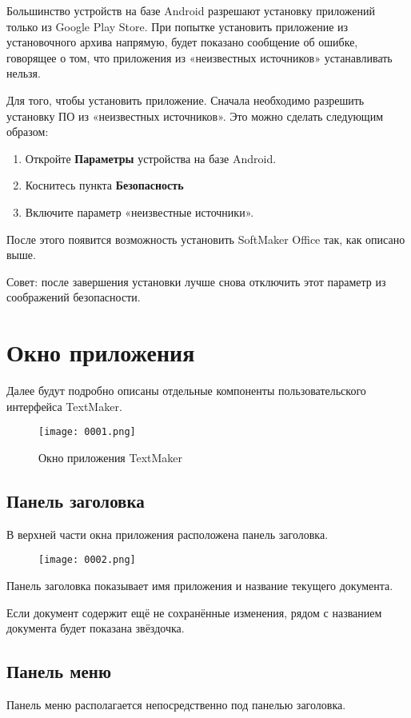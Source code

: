 ﻿\documentclass[a4paper,10pt]{article}
\begin{document}
Большинство устройств на базе Android разрешают установку приложений только из Google Play Store. При попытке установить приложение из установочного архива напрямую, будет показано сообщение об ошибке, говорящее о том, что приложения из «неизвестных источников» устанавливать нельзя.

Для того, чтобы установить приложение. Сначала необходимо разрешить установку ПО из «неизвестных источников». Это можно сделать следующим образом:
\begin{enumerate}
 \item Откройте \textbf{Параметры} устройства на базе Android.
 \item Коснитесь пункта \textbf{Безопасность}
 \item Включите параметр «неизвестные источники».
\end{enumerate}
После этого появится возможность установить SoftMaker Office так, как описано выше.

Совет: после завершения установки лучше снова отключить этот параметр из соображений безопасности.

\section{Окно приложения} \label{sec:ок}
Далее будут подробно описаны отдельные компоненты пользовательского интерфейса TextMaker.

\begin{figure}[ht]
\texttt{[image: 0001.png]}
\centering
\caption{Окно приложения TextMaker}
\end{figure}

\subsection{Панель заголовка}
В верхней части окна приложения расположена панель заголовка.

\begin{figure}[ht]
\texttt{[image: 0002.png]}
\centering
\end{figure}
Панель заголовка показывает имя приложения и название текущего документа.

Если документ содержит ещё не сохранённые изменения, рядом с названием документа будет показана звёздочка.
\subsection{Панель меню}
Панель меню располагается непосредственно под панелью заголовка.
\end{document}
